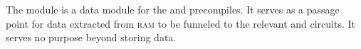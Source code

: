 The \blkMdxMod{} module is a data module for the  and  precompiles.
It serves as a passage point for data extracted from \textsc{ram} to be funneled to the relevant  and  circuits.
It serves no purpose beyond storing data.
